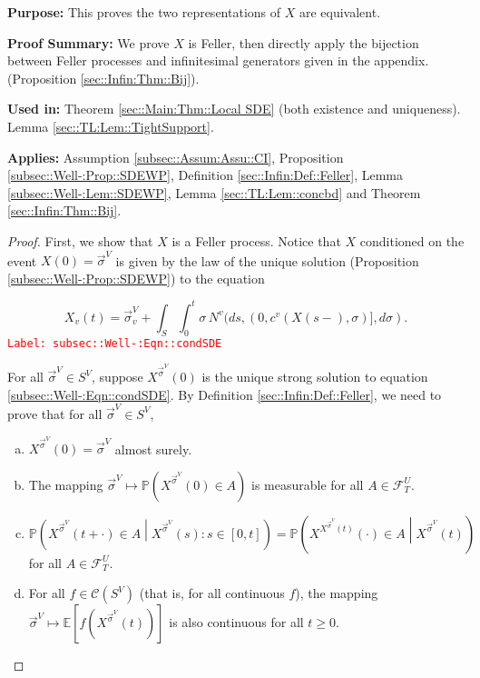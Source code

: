 \documentclass[12pt]{article}
\newcommand{\mb}{\mathbb}
\newcommand{\mc}{\mathcal}
\newcommand{\tr}{\textcolor{red}}
\newcommand{\labe}[1]{\tr{\texttt{Label: #1}}}
\newcommand{\purpose}{\textbf{Purpose: }}
\newcommand{\pfsum}{\textbf{Proof Summary: }}
\newcommand{\usein}{\textbf{Used in: }}
\newcommand{\app}{\textbf{Applies: }}
\newcommand{\pr}{\mb{P}}							%
\newcommand{\ex}[1]{\mb{E}\left[#1\right]}			%
\renewcommand{\v}{v}							%
\renewcommand{\U}{U}							%
\renewcommand{\S}{S}							%
\newcommand{\s}{\sigma}							%
\newcommand{\sv}{\vec{\s}}						%
\newcommand{\T}{T}								%
\renewcommand{\t}{t}							%
\renewcommand{\tt}{s}							%
\newcommand{\F}{\mc{F}}							%
\newcommand{\X}{X}								%
\newcommand{\IGr}{c}							%
\newcommand{\vind}[1]{^{#1}}					%
\newcommand{\carp}[1]{^{#1}}					%
\newcommand{\vsi}[1]{^{#1}}						%
\newcommand{\cind}[1]{_{#1}}					%
\newcommand{\tp}[1]{(#1)}						%
\newcommand{\ts}[1]{_{#1}}						%
\newcommand{\cont}{\mc{C}}						%
\newcommand{\poiss}{N}							%
\newcommand{\pst}[1]{^{#1}}						%
\begin{document}
\purpose This proves the two representations of \(\X\) are equivalent.

\pfsum We prove \(\X\) is Feller, then directly apply the bijection between Feller processes and infinitesimal generators given in the appendix. (Proposition \ref{sec::Infin:Thm::Bij}).

\usein Theorem \ref{sec::Main:Thm::Local SDE} (both existence and uniqueness). Lemma \ref{sec::TL:Lem::TightSupport}.

\app Assumption \ref{subsec::Assum:Assu::CI}, Proposition \ref{subsec::Well-:Prop::SDEWP}, Definition \ref{sec::Infin:Def::Feller}, Lemma \ref{subsec::Well-:Lem::SDEWP}, Lemma \ref{sec::TL:Lem::concbd} and Theorem \ref{sec::Infin:Thm::Bij}.

\begin{proof}
First, we show that \(\X\) is a Feller process. Notice that \(\X\) conditioned on the event \(\X\tp{0} = \sv\vsi{V}\) is given by the law of the unique solution (Proposition \ref{subsec::Well-:Prop::SDEWP}) to the equation

\begin{equation}
\X\cind{\v}\tp{\t} = \sv\cind{\v}\vsi{V} + \int_\S\int_0^\t \s\,\poiss\vind{\v}(d\tt,(0,\IGr\vind{\v}(\X\tp{\tt-},\s)],d\s).
\label{subsec::Well-:Eqn::condSDE}
\end{equation}
\labe{subsec::Well-:Eqn::condSDE}

For all \(\sv\vsi{V}\in\S\carp{V}\), suppose \(\X\pst{\sv\vsi{V}}\tp{0}\) is the unique strong solution to equation \eqref{subsec::Well-:Eqn::condSDE}. By Definition \ref{sec::Infin:Def::Feller}, we need to prove that for all \(\sv\vsi{V}\in \S\carp{V}\),

\begin{enumerate}[(a)]
\item \(\X\pst{\sv\vsi{V}}\tp{0} = \sv\vsi{V}\) almost surely.

\item The mapping \(\sv\vsi{V}\mapsto \pr\left(\X\pst{\sv\vsi{V}}\tp{0}\in A\right)\) is measurable for all \(A\in \F\vsi{\U}\ts{\T}\).

\item \(\pr\left(\X\pst{\sv\vsi{V}}\tp{\t+\cdot}\in A\middle|\X\pst{\sv\vsi{V}}\tp{\tt}:\tt \in [0,\t]\right) = \pr\left(\X\pst{\X\pst{\sv\vsi{V}}\tp{\t}}\tp{\cdot} \in A\middle| \X\pst{\sv\vsi{V}}\tp{\t} \right)\) for all \(A \in \F\vsi{\U}\ts{\T}\).

\item For all \(f \in \cont(\S\carp{V})\) (that is, for all continuous \(f\)), the mapping \(\sv\vsi{V}\mapsto \ex{f(\X\pst{\sv\vsi{V}}\tp{\t})}\) is also continuous for all \(\t\geq 0\).
\end{enumerate}


\end{proof}
\end{document}
